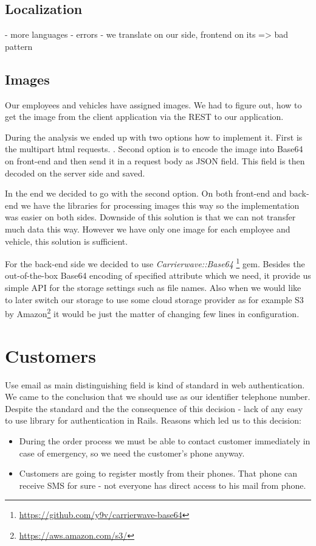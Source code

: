 \subsection{Localization}
- more languages - errors
 - we translate on our side, frontend on its => bad pattern
\subsection{Images}
	Our employees and vehicles have assigned images. We had to figure out, how to get the image from the client application via the REST to our application. 
	
	During the analysis we ended up with two options how to implement it. First is the multipart html requests. . Second option is to encode the image into Base64 on front-end and then send it in a request body as JSON field. This field is then decoded on the server side and saved.
	
	In the end we decided to go with the second option. On both front-end and back-end we have the libraries for processing images this way so the implementation was easier on both sides. Downside of this solution is that we can not transfer much data this way. However we have only one image for each employee and vehicle, this solution is sufficient.

	For the back-end side we decided to use \textit{Carrierwave::Base64} \footnote{\url{https://github.com/y9v/carrierwave-base64}} gem. Besides the out-of-the-box Base64 encoding of specified attribute  which we need, it provide us simple API for the storage settings such as file names. Also when we would like to later switch our storage to use some cloud storage provider as for example S3 by Amazon\footnote{\url{https://aws.amazon.com/s3/}} it would be just the matter of changing few lines in configuration. 

\section{Customers}
Use email as main distinguishing field is kind of standard in web authentication. We came to the conclusion that we should use as our identifier telephone number. Despite the standard and the the consequence of this decision - lack of any easy to use library for authentication in Rails. Reasons which led us to this decision:
\begin{itemize}
	\item During the order process we must be able to contact customer immediately in case of emergency, so we need the customer's phone anyway.
	\item Customers are going to register mostly from their phones. That phone can receive SMS for sure - not everyone has direct access to his mail from phone. 
\end{itemize}
